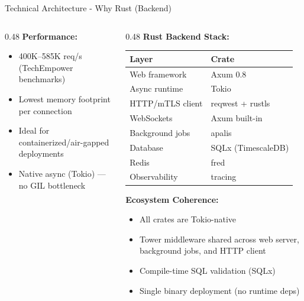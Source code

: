 \begin{frame}{Technical Architecture - Why Rust (Backend)}
\begin{columns}[T]
\begin{column}{0.48\textwidth}
      \textbf{Performance:}
      \begin{itemize}
        \setlength{\itemsep}{0pt}
        \item 400K--585K req/s (TechEmpower benchmarks)
        \item Lowest memory footprint per connection
        \item Ideal for containerized/air-gapped deployments
        \item Native async (Tokio) --- no GIL bottleneck
      \end{itemize}
    \end{column}
    \begin{column}{0.48\textwidth}
      \textbf{Rust Backend Stack:}
      \begin{center}
        \begin{tabular}{|l|l|}
          \hline
          \textbf{Layer} & \textbf{Crate} \\
          \hline
          Web framework & Axum 0.8 \\
          \hline
          Async runtime & Tokio \\
          \hline
          HTTP/mTLS client & reqwest + rustls \\
          \hline
          WebSockets & Axum built-in \\
          \hline
          Background jobs & apalis \\
          \hline
          Database & SQLx (TimescaleDB) \\
          \hline
          Redis & fred \\
          \hline
          Observability & tracing \\
          \hline
        \end{tabular}
      \end{center}

      \vspace{0.05cm}

      \textbf{Ecosystem Coherence:}
      \begin{itemize}
        \setlength{\itemsep}{0pt}
        \item All crates are Tokio-native
        \item Tower middleware shared across web server, background jobs, and HTTP client
        \item Compile-time SQL validation (SQLx)
        \item Single binary deployment (no runtime deps)
      \end{itemize}
    \end{column}
  \end{columns}
\end{frame}

